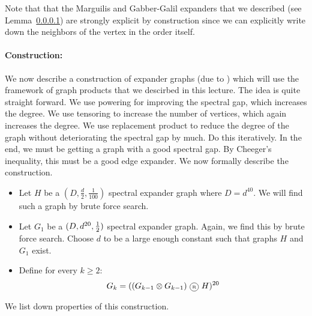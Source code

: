 \noindent Note that that the Marguilis and Gabber-Galil expanders that we described (see Lemma~\ref{}) are strongly explicit by construction since we can explicitly write down the neighbors of the vertex in the order itself.
\vspace{-4mm}

\paragraph{Construction:}
We now describe a construction of expander graphs (due to \cite{}) which will use the framework of graph products that we descirbed in this lecture. The idea is quite straight forward. We use powering for improving the spectral gap, which increases the degree. We use tensoring to increase the number of vertices, which again increases the degree. We use replacement product to reduce the degree of the graph without deteriorating the spectral gap by much. Do this iteratively. In the end, we must be getting a graph with a good spectral gap. By Cheeger's inequality, this must be a good edge expander. We now formally describe the construction.
\begin{itemize}
\itemsep-3pt
\item Let $H$ be a $(D,\frac{d}{2},\frac{1}{100})$ spectral expander graph where $D = d^{40}$. We will find such a graph by brute force search. 
\item Let $G_1$ be a $(D,d^{20},\frac{1}{2})$ spectral expander graph. Again, we find this by brute force search. Choose $d$ to be a large enough constant such that graphs $H$ and $G_1$ exist.
\item Define for every $k\ge 2$:
$$G_k = ((G_{k-1} \otimes G_{k-1}) \circled{R} H)^{20}$$
\end{itemize}
We list down properties of this construction.
